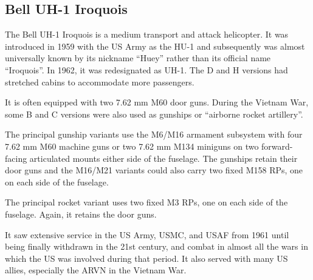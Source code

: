 
\subsection{Bell UH-1 Iroquois}

The Bell UH-1 Iroquois is a medium transport and attack helicopter. It was introduced in 1959 with the US Army as the HU-1 and subsequently was almost universally known by its nickname “Huey” rather than its official name “Iroquois”. In 1962, it was redesignated as UH-1. The D and H versions had stretched cabins to accommodate more passengers.

It is often equipped with two 7.62 mm M60 door guns. During the Vietnam War, some B and C versions were also used as gunships or “airborne rocket artillery”. 

The principal gunship variants use the M6/M16 armament subsystem with four 7.62 mm M60 machine guns or two 7.62 mm M134 miniguns on two forward-facing articulated mounts either side of the fuselage. The gunships retain their door guns and the M16/M21 variants could also carry two fixed M158  RPs, one on each side of the fuselage. 

The principal rocket variant uses two fixed M3  RPs, one on each side of the fuselage. Again, it retains the door guns.

It saw extensive service in the US Army, USMC, and USAF from 1961 until being finally withdrawn in the 21st century, and combat in almost all the wars in which the US was involved during that period. It also served with many US allies, especially the ARVN in the Vietnam War.
